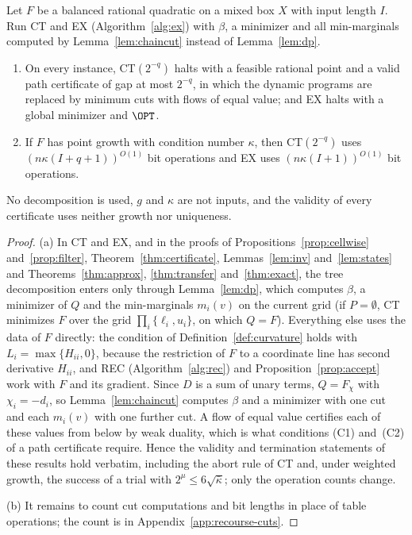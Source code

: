 \begin{theorem}\label{thm:balanced}
Let $F$ be a balanced rational quadratic on a mixed box $X$ with input
length $I$. Run CT and EX (Algorithm~\ref{alg:ex}) with $\beta$, a
minimizer and all min-marginals computed by Lemma~\ref{lem:chaincut} instead
of Lemma~\ref{lem:dp}.
\begin{enumerate}[label=(\alph*)]
\item On every instance, CT$(2^{-q})$ halts with a feasible rational point
and a valid path certificate of gap at most $2^{-q}$, in which the dynamic
programs are replaced by minimum cuts with flows of equal value; and EX
halts with a global minimizer and $\OPT$.
\item If $F$ has point growth with condition number $\kappa$, then
CT$(2^{-q})$ uses $(n\kappa(I+q+1))^{O(1)}$ bit operations and EX uses
$(n\kappa(I+1))^{O(1)}$ bit operations.
\end{enumerate}
No decomposition is used, $g$ and $\kappa$ are not inputs, and the validity
of every certificate uses neither growth nor uniqueness.
\end{theorem}

\begin{proof}
(a) In CT and EX, and in the proofs of Propositions~\ref{prop:cellwise}
and~\ref{prop:filter}, Theorem~\ref{thm:certificate},
Lemmas~\ref{lem:inv} and~\ref{lem:states} and
Theorems~\ref{thm:approx}, \ref{thm:transfer} and~\ref{thm:exact}, the tree
decomposition enters only through Lemma~\ref{lem:dp}, which computes
$\beta$, a minimizer of $Q$ and the min-marginals $m_i(v)$ on the current
grid (if $P=\emptyset$, CT minimizes $F$ over the grid
$\prod_i\{\ell_i,u_i\}$, on which $Q=F$). Everything else uses the data of
$F$ directly: the condition of Definition~\ref{def:curvature} holds with
$L_i=\max\{H_{ii},0\}$, because the restriction of $F$ to a coordinate line
has second derivative $H_{ii}$, and REC (Algorithm~\ref{alg:rec}) and
Proposition~\ref{prop:accept} work with $F$ and its gradient. Since $D$ is a
sum of unary terms, $Q=F_\chi$ with $\chi_i=-d_i$, so
Lemma~\ref{lem:chaincut} computes $\beta$ and a minimizer with one cut and
each $m_i(v)$ with one further cut. A flow of equal value certifies each of
these values from below by weak duality, which is what conditions (C1)
and~(C2) of a path certificate require. Hence the validity and termination
statements of these results hold verbatim, including the abort rule of CT
and, under weighted growth, the success of a trial with
$2^\mu\le6\sqrt{\bar\kappa}$; only the operation counts change.

(b) It remains to count cut computations and bit lengths in place of table
operations; the count is in Appendix~\ref{app:recourse-cuts}.
\end{proof}

